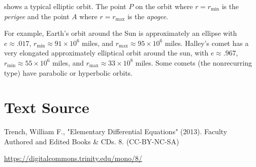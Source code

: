 \documentclass{ximera}
\begin{document}
 shows a typical elliptic orbit.
The point $P$ on the orbit where $r=r_{\min}$ is the  \textit{perigee} and  the point $A$ where $r=r_{\max}$ is the \textit{apogee}.

For example, Earth's orbit around the Sun is approximately an ellipse
with $e\approx.017$, $r_{\min}\approx91\times 10^6$ miles, and
$r_{\max}\approx 95\times 10^6$ miles. Halley's comet has a very
elongated approximately elliptical orbit around the sun, with
$e\approx.967$, $r_{\min}\approx55\times10^6$ miles, and
$r_{\max}\approx33\times10^8$ miles. Some comets (the nonrecurring
type) have parabolic or hyperbolic orbits.


\section*{Text Source}
Trench, William F., "Elementary Differential Equations" (2013). Faculty Authored and Edited Books \& CDs. 8. (CC-BY-NC-SA)

\href{https://digitalcommons.trinity.edu/mono/8/}{https://digitalcommons.trinity.edu/mono/8/}
\end{document}
